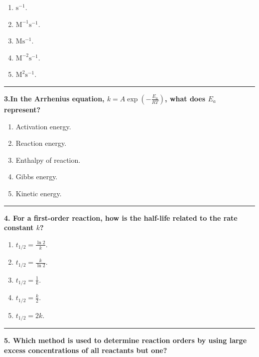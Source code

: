 \documentclass[
  9pt,
]{extbook}
\providecommand{\tightlist}{%
  \setlength{\itemsep}{0pt}\setlength{\parskip}{0pt}}
\theoremstyle{definition}
\theoremstyle{definition}
\theoremstyle{definition}
\theoremstyle{definition}
\theoremstyle{remark}
\begin{document}
\begin{enumerate}
\def\labelenumi{\alph{enumi}.}
\tightlist
\item
  \(\text{s}^{-1}\).
\item
  \(\text{M}^{-1}\text{s}^{-1}\).
\item
  \(\text{M}\text{s}^{-1}\).
\item
  \(\text{M}^{-2}\text{s}^{-1}\).
\item
  \(\text{M}^2\text{s}^{-1}\).
\end{enumerate}

\begin{center}\rule{0.5\linewidth}{0.5pt}\end{center}

\textbf{3.In the Arrhenius equation, \(k = A\exp(-\frac{E_a}{RT})\), what does \(E_a\) represent?}

\begin{enumerate}
\def\labelenumi{\alph{enumi}.}
\tightlist
\item
  Activation energy.
\item
  Reaction energy.
\item
  Enthalpy of reaction.
\item
  Gibbs energy.
\item
  Kinetic energy.
\end{enumerate}

\begin{center}\rule{0.5\linewidth}{0.5pt}\end{center}

\textbf{4. For a first-order reaction, how is the half-life related to the rate constant \(k\)?}

\begin{enumerate}
\def\labelenumi{\alph{enumi}.}
\tightlist
\item
  \(t_{1/2} = \frac{\ln 2}{k}\).
\item
  \(t_{1/2} = \frac{k}{\ln 2}\).
\item
  \(t_{1/2} = \frac{1}{k}\).
\item
  \(t_{1/2} = \frac{k}{2}\).
\item
  \(t_{1/2} = 2k\).
\end{enumerate}

\begin{center}\rule{0.5\linewidth}{0.5pt}\end{center}

\textbf{5. Which method is used to determine reaction orders by using large excess concentrations of all reactants but one?}
\end{document}
